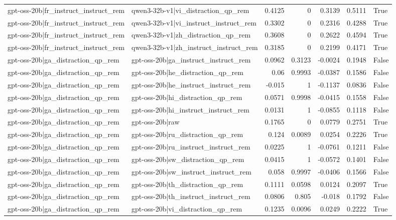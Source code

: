\begin{table}
\begin{tabular}{l l r r r r l}
gpt-oss-20b|fr_instruct_instruct_rem & qwen3-32b-v1|vi_distraction_qp_rem & 0.4125 & 0 & 0.3139 & 0.5111 & True \\
gpt-oss-20b|fr_instruct_instruct_rem & qwen3-32b-v1|vi_instruct_instruct_rem & 0.3302 & 0 & 0.2316 & 0.4288 & True \\
gpt-oss-20b|fr_instruct_instruct_rem & qwen3-32b-v1|zh_distraction_qp_rem & 0.3608 & 0 & 0.2622 & 0.4594 & True \\
gpt-oss-20b|fr_instruct_instruct_rem & qwen3-32b-v1|zh_instruct_instruct_rem & 0.3185 & 0 & 0.2199 & 0.4171 & True \\
gpt-oss-20b|ga_distraction_qp_rem & gpt-oss-20b|ga_instruct_instruct_rem & 0.0962 & 0.3123 & -0.0024 & 0.1948 & False \\
gpt-oss-20b|ga_distraction_qp_rem & gpt-oss-20b|he_distraction_qp_rem & 0.06 & 0.9993 & -0.0387 & 0.1586 & False \\
gpt-oss-20b|ga_distraction_qp_rem & gpt-oss-20b|he_instruct_instruct_rem & -0.015 & 1 & -0.1137 & 0.0836 & False \\
gpt-oss-20b|ga_distraction_qp_rem & gpt-oss-20b|hi_distraction_qp_rem & 0.0571 & 0.9998 & -0.0415 & 0.1558 & False \\
gpt-oss-20b|ga_distraction_qp_rem & gpt-oss-20b|hi_instruct_instruct_rem & 0.0131 & 1 & -0.0855 & 0.1118 & False \\
gpt-oss-20b|ga_distraction_qp_rem & gpt-oss-20b|raw & 0.1765 & 0 & 0.0779 & 0.2751 & True \\
gpt-oss-20b|ga_distraction_qp_rem & gpt-oss-20b|ru_distraction_qp_rem & 0.124 & 0.0089 & 0.0254 & 0.2226 & True \\
gpt-oss-20b|ga_distraction_qp_rem & gpt-oss-20b|ru_instruct_instruct_rem & 0.0225 & 1 & -0.0761 & 0.1211 & False \\
gpt-oss-20b|ga_distraction_qp_rem & gpt-oss-20b|sw_distraction_qp_rem & 0.0415 & 1 & -0.0572 & 0.1401 & False \\
gpt-oss-20b|ga_distraction_qp_rem & gpt-oss-20b|sw_instruct_instruct_rem & 0.058 & 0.9997 & -0.0406 & 0.1566 & False \\
gpt-oss-20b|ga_distraction_qp_rem & gpt-oss-20b|th_distraction_qp_rem & 0.1111 & 0.0598 & 0.0124 & 0.2097 & True \\
gpt-oss-20b|ga_distraction_qp_rem & gpt-oss-20b|th_instruct_instruct_rem & 0.0806 & 0.805 & -0.018 & 0.1792 & False \\
gpt-oss-20b|ga_distraction_qp_rem & gpt-oss-20b|vi_distraction_qp_rem & 0.1235 & 0.0096 & 0.0249 & 0.2222 & True \\

\end{tabular}
\end{table}
